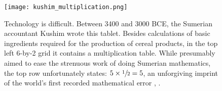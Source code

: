 



\begin{figure}[t]
    \centering
    \texttt{[image: kushim\_multiplication.png]}
    \caption[Technology is difficult. The Sumerian accountant Kushim mistakenly added $5 \times \sfrac{1}{2} = 5$ to their multiplication table.]{ Technology is difficult. Between 3400 and 3000 BCE, the Sumerian accountant Kushim wrote this tablet. Besides calculations of basic ingredients required for the production of cereal products, in the top left 6-by-2 grid it contains a multiplication table. While presumably aimed to ease the strenuous work of doing Sumerian mathematics, the top row unfortunately states: $5 \times \sfrac{1}{2} = 5$, an unforgiving imprint of the world's first recorded mathematical error \parencite{nissen_archaic_1993, renn_learning_2019}, \parencite[photo credit][]{cuneiformdigitallibraryinitiativecdli_msvo_2018}.}
    \label{fig:kushim_multiplication}
\end{figure}

